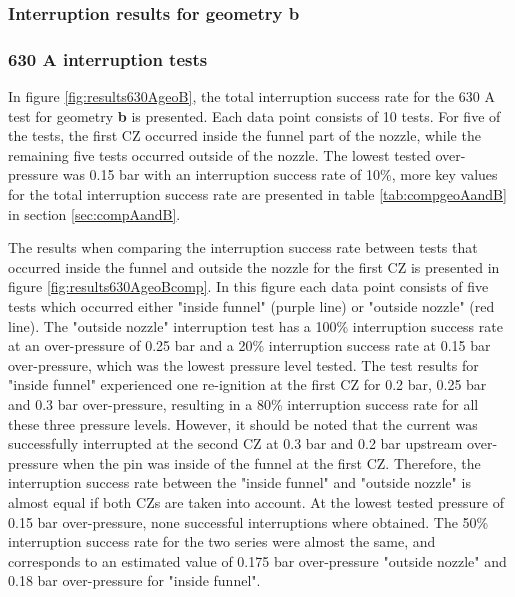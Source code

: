 \documentclass[10pt,b5paper,twoside]{article}
\begin{document}
\subsubsection{Interruption results for geometry \textbf{b}} \label{sec:intTestGeoB}

\subsubsection*{630 A interruption tests}

In figure \ref{fig:results630AgeoB}, the total interruption success rate for the 630 A test for geometry \textbf{b} is presented. Each data point consists of 10 tests. For five of the tests, the first CZ occurred inside the funnel part of the nozzle, while the remaining five tests occurred outside of the nozzle. The lowest tested over-pressure was 0.15 bar with an interruption success rate of 10\%, more key values for the total interruption success rate are presented in table \ref{tab:compgeoAandB} in section \ref{sec:compAandB}. 


The results when comparing the interruption success rate between tests that occurred inside the funnel and outside the nozzle for the first CZ is presented in figure \ref{fig:results630AgeoBcomp}. In this figure each data point consists of five tests which occurred either "inside funnel" (purple line) or "outside nozzle" (red line). The "outside nozzle" interruption test has a 100\% interruption success rate at an over-pressure of 0.25 bar and a 20\% interruption success rate at 0.15 bar over-pressure, which was the lowest pressure level tested. The test results for "inside funnel" experienced one re-ignition at the first CZ for 0.2 bar, 0.25 bar and 0.3 bar over-pressure, resulting in a 80\% interruption success rate for all these three pressure levels. However, it should be noted that the current was successfully interrupted at the second CZ at 0.3 bar and 0.2 bar upstream over-pressure when the pin was inside of the funnel at the first CZ. Therefore, the interruption success rate between the "inside funnel" and "outside nozzle" is almost equal if both CZs are taken into account. At the lowest tested pressure of 0.15 bar over-pressure, none successful interruptions where obtained. The 50\% interruption success rate for the two series were almost the same, and corresponds to an estimated value of 0.175 bar over-pressure "outside nozzle" and 0.18 bar over-pressure for "inside funnel". 
\end{document}
